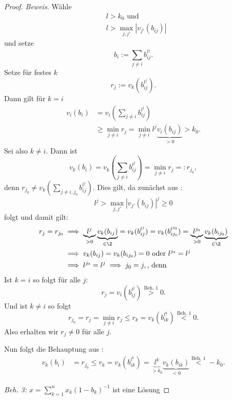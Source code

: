 \begin{proof}
    \emph{Beweis.} Wähle 
    \begin{align}
        & l> k_0 \text{ und}\label{*}\tag{$*$}\\
        & l > \max\limits_{j,j'}|v_{j'}(b_{ij})|\label{**}\tag{$**$}
    \end{align}
    und setze
    $$ b_i := \sum\limits_{j \ne i} b_{ij}^{l^j}.$$
    Setze für festes $k$ $$ r_{j} := v_k(b_{ij}^{l^j}).$$
    Dann gilt für $k=i$ 
    \begin{align*}
        v_i(b_i) &= v_i\left(\sum_{j \ne i} b_{ij}^{l^j}\right)\\
            & \geq \min_{j \ne i} r_{j} = \min_{j \ne i} l^j \underbrace{v_i(b_{ij})}_{> 0} > k_0.
    \end{align*}
    Sei also $k \ne i$. Dann ist
    $$ v_k(b_i) = v_k\left(\sum_{j \ne i} b_{ij}^{l^j}\right) = \min_{j \ne i} r_{j} =: r_{j_0}, $$
    denn $r_{j_0} \ne v_k\left(\sum_{j \ne i,j_0} b_{ij}^{l^j}\right)$.
    Dies gilt, da zunächst aus :
    $$l^j > \max\limits_{j,j'}|v_{j'}(b_{ij})|^j \geq 0$$
    folgt und damit gilt:
    \begin{align*}
        r_j = r_{j_0} & \implies \underbrace{l^j}_{>0}\underbrace{v_k(b_{ij})}_{\in \Z} = v_k(b_{ij}^{l^j}) 
            = v_k(b_{ij_0}^{l^{j_0}}) = \underbrace{l^{j_0}}_{>0}\underbrace{v_k(b_{ij_0})}_{\in \Z} \\
            & \implies v_k(b_{ij}) = v_k(b_{ij_0}) = 0 \text{ oder } l^{j_0} = l^j\\
            & \implies l^{j_0} = l^j \implies j_0 = j, \text{, denn}
    \end{align*}
    Ist $k = i$ so folgt für alle $j$:
    $$ r_j = v_i(b_{ij}^{l^j}) \stackrel{\text{Beh. 1}}{>} 0. $$
    Und ist $k \ne i$ so folgt
    $$ r_{j_0} = r_j = \min_{j \ne i} r_j \leq r_k = v_k(b_{ik}^{l^k}) \stackrel{\text{Beh. 1}}{<} 0.$$
    Also erhalten wir $r_j \ne 0$ für alle $j$.

    Nun folgt die Behauptung aus :
    \begin{align*}
        v_k(b_i) & = r_{j_0} \leq  r_k = v_k(b_{ik}^{l^k}) = 
            \underbrace{l^k}_{> k_0} \underbrace{v_k(b_{ik})}_{< 0}  \stackrel{\text{Beh. 1}}{<} -k_0.
    \end{align*}

    \emph{Beh. 3:} $ x = \sum\limits_{k=1}^n x_k(1-b_k)^{-1}$ ist eine Lösung
    

\end{proof}

